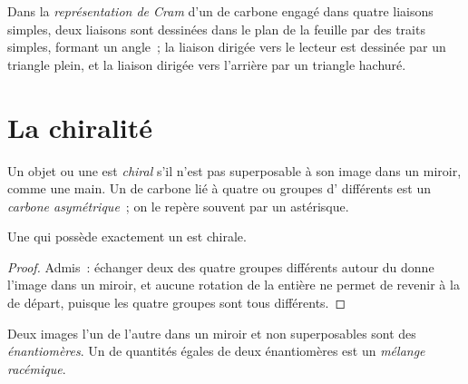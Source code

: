 \begin{definition}\label{def:g12:stereochemistry:cram}
Dans la \emph{représentation de Cram}
d'un  de carbone engagé dans quatre liaisons simples, deux liaisons
sont dessinées dans le plan de la feuille par des traits simples,
formant un angle~; la liaison dirigée vers le lecteur est dessinée par
un triangle plein, et la liaison dirigée vers l'arrière par un triangle
hachuré.
\end{definition}

\section{La chiralité}

\begin{definition}\label{def:g12:stereochemistry:chiral}
Un objet ou une  est \emph{chiral} s'il n'est pas
superposable à son image dans un miroir, comme une main. Un  de
carbone lié à quatre  ou groupes d' différents est un
\emph{carbone asymétrique}~; on le repère
souvent par un astérisque.
\end{definition}

\begin{proposition}\label{prop:g12:stereochemistry:one-carbon}
Une  qui possède exactement un  est chirale.
\end{proposition}

\begin{proof}
Admis~: échanger deux des quatre groupes différents autour du  donne l'image dans un miroir, et aucune rotation de la
 entière ne permet de revenir à la  de départ, puisque
les quatre groupes sont tous différents.
\end{proof}

\begin{definition}\label{def:g12:stereochemistry:enantiomer}
Deux  images l'un de l'autre dans un miroir et non
superposables sont des \emph{énantiomères}. Un
 de quantités égales de deux énantiomères est un \emph{mélange
racémique}.
\end{definition}

